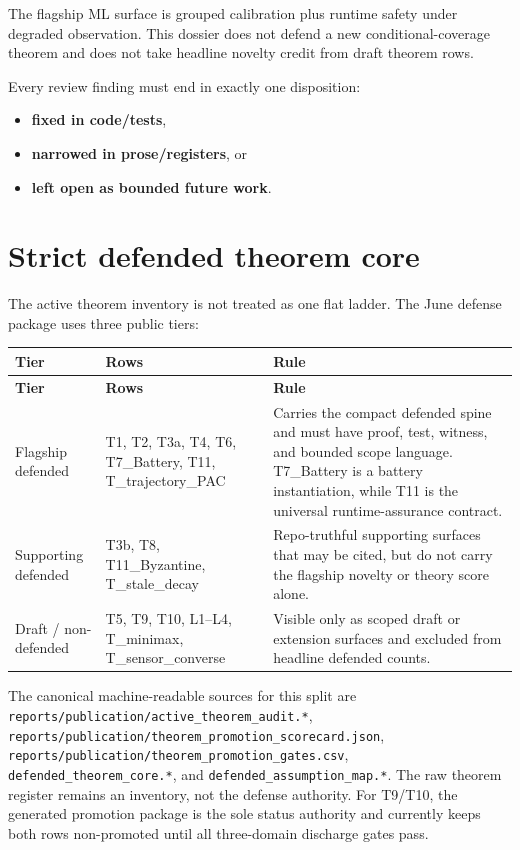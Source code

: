 \documentclass[11pt,oneside]{report}
\begin{document}
The flagship ML surface is grouped calibration plus runtime safety under degraded observation. This dossier does not defend a new conditional-coverage theorem and does not take headline novelty credit from draft theorem rows.

Every review finding must end in exactly one disposition:
\begin{itemize}
\item \textbf{fixed in code/tests},
\item \textbf{narrowed in prose/registers}, or
\item \textbf{left open as bounded future work}.
\end{itemize}

\section*{Strict defended theorem core}
The active theorem inventory is not treated as one flat ladder. The June defense
package uses three public tiers:
\begin{longtable}{p{}p{}p{}}
\toprule
\textbf{Tier} & \textbf{Rows} & \textbf{Rule}\\
\midrule
\endfirsthead
\toprule
\textbf{Tier} & \textbf{Rows} & \textbf{Rule}\\
\midrule
\endhead
Flagship defended & T1, T2, T3a, T4, T6, T7\_Battery, T11, T\_trajectory\_PAC & Carries the compact defended spine and must have proof, test, witness, and bounded scope language. T7\_Battery is a battery instantiation, while T11 is the universal runtime-assurance contract.\\
Supporting defended & T3b, T8, T11\_Byzantine, T\_stale\_decay & Repo-truthful supporting surfaces that may be cited, but do not carry the flagship novelty or theory score alone.\\
Draft / non-defended & T5, T9, T10, L1--L4, T\_minimax, T\_sensor\_converse & Visible only as scoped draft or extension surfaces and excluded from headline defended counts.\\
\bottomrule
\end{longtable}

The canonical machine-readable sources for this split are
\texttt{reports/publication/active\_theorem\_audit.*},
\texttt{reports/publication/theorem\_promotion\_scorecard.json},
\texttt{reports/publication/theorem\_promotion\_gates.csv},
\texttt{defended\_theorem\_core.*}, and
\texttt{defended\_assumption\_map.*}. The raw theorem register remains an
inventory, not the defense authority. For T9/T10, the generated promotion package is
the sole status authority and currently keeps both rows non-promoted until all
three-domain discharge gates pass.
\end{document}
